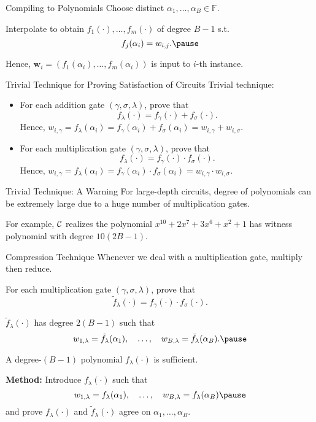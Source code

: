 
\begin{frame}{Compiling to Polynomials}
	Choose distinct $\alpha_1, \dots, \alpha_B \in \mathbb{F}$.\pause
	
	Interpolate to obtain $f_1(\cdot), \dots, f_m(\cdot)$ of degree $B - 1$ s.t.\pause
	\begin{equation*}
		f_j(\alpha_i) = w_{i,j}.\pause
	\end{equation*}

	Hence, $\mathbf{w}_i = (f_1(\alpha_i), \dots, f_m(\alpha_i))$ is input to $i$-th instance. 
\end{frame}

\begin{frame}{Trivial Technique for Proving Satisfaction of Circuits}
	Trivial technique:\pause
	\begin{itemize}
		\item For each addition gate $(\gamma, \sigma, \lambda)$, prove that $$f_\lambda(\cdot) = f_\gamma(\cdot) + f_\sigma(\cdot).$$\pause
		Hence, $w_{i,\gamma} = f_\lambda(\alpha_i) = f_\gamma(\alpha_i) + f_\sigma(\alpha_i) = w_{i, \gamma} + w_{i, \sigma}$.\pause
		\item For each multiplication gate $(\gamma, \sigma, \lambda)$, prove that $$f_\lambda(\cdot) = f_\gamma(\cdot) \cdot f_\sigma(\cdot).$$\pause
		Hence, $w_{i,\gamma} = f_\lambda(\alpha_i) = f_\gamma(\alpha_i) \cdot f_\sigma(\alpha_i) = w_{i, \gamma} \cdot w_{i, \sigma}$.
	\end{itemize} 
\end{frame} 
\begin{frame}{Trivial Technique: A Warning}
	For large-depth circuits, degree of polynomials can be extremely large due to a huge number of multiplication gates.\pause
	
	For example, $\mathcal{C}$ realizes the polynomial $x^{10} + 2x^7 + 3x^6 + x^2 + 1$ has witness polynomial with degree $10(2B - 1)$.
\end{frame} 
\begin{frame}{Compression Technique}
	Whenever we deal with a multiplication gate, multiply then reduce.\pause
	
	For each multiplication gate $(\gamma, \sigma, \lambda)$, prove that $$\tilde{f}_\lambda(\cdot) = f_\gamma(\cdot) \cdot f_\sigma(\cdot).$$\pause
	
	$\tilde{f}_\lambda(\cdot)$ has degree $2(B - 1)$ such that \pause
	\begin{equation*}
	 	w_{1, \lambda} = \tilde{f}_\lambda(\alpha_1), \quad \dots, \quad w_{B, \lambda} = \tilde{f}_\lambda(\alpha_B). \pause
	\end{equation*}
	
	A degree-$(B - 1)$ polynomial $f_\lambda(\cdot)$ is sufficient.\pause
	
	\textbf{Method:} Introduce $f_\lambda(\cdot)$ such that \pause
	\begin{equation*}
		w_{1, \lambda} = f_\lambda(\alpha_1), \quad \dots, \quad w_{B, \lambda} = f_\lambda(\alpha_B)\pause
	\end{equation*}
	and prove $f_\lambda(\cdot)$ and $\tilde{f}_\lambda(\cdot)$ agree on $\alpha_1, \dots, \alpha_B$.
\end{frame}
